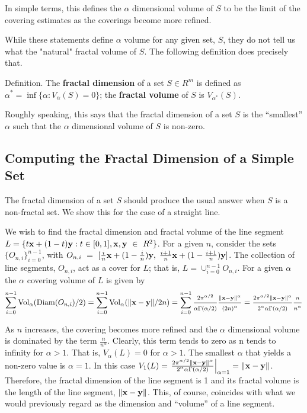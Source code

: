  In simple terms, this defines the $\alpha$ dimensional volume of $S$
to be the limit of the covering estimates as the coverings become more refined.

While these statements define $\alpha$ volume for any given set, $S$,
they do not tell us what the "natural" fractal volume of $S$.
 The following definition does precisely that.

\proclaim Definition. The {\bf fractal dimension} of a 
set $S \in R^m$ is defined as
$\alpha^* = \inf\{\alpha : V_\alpha(S) = 0 \}$; the 
{\bf fractal volume} of $S$ is $V_{\alpha^*}(S)$.

Roughly speaking, this says that the fractal dimension of a set $S$ is the
``smallest'' $\alpha$ such that the $\alpha$ dimensional volume of $S$ is non-zero.

\subsection{Computing the Fractal Dimension of a Simple Set}

The fractal dimension of a set $S$ should produce the usual
answer when $S$ is a non-fractal set. We show this for the case of a
straight line.

We wish to find the fractal dimension and fractal volume of the line
segment $L = \{t{\bf x} + (1-t){\bf y} : t \in [0,1] , {\bf x, y}~\in~R^2\}$.
For a given $n$, consider the sets $\{O_{n,i}\}_{i=0}^{n-1}$, with $O_{n,i}~=~
[\frac{i}{n}{\bf x} + (1-\frac{i}{n}){\bf y}, \; \frac{i+1}{n}{\bf x} + (1 -
\frac{i+1}{n}){\bf y}]$. The collection of line segments, $O_{n,i}$, act
as a cover for $L$; that is, $L =
\cup_{i=0}^{n-1} O_{n,i}$. For a given $\alpha$ the
$\alpha$ covering volume of $L$ is given by
$$
\sum_{i=0}^{n-1} {\rm Vol}_\alpha({\rm Diam}(O_{n,i})/2) = \sum_{i=0}^{n-1}
{\rm Vol}_\alpha(\|{\bf x} - {\bf y}\|/2n) =  \sum_{i=0}^{n-1} \frac{2
\pi^{\alpha / 2}}{\alpha \Gamma(\alpha / 2)} \frac{\|{\bf x} - {\bf
y}\|^\alpha}{(2n)^\alpha} = \frac{2 \pi^{\alpha / 2} \|{\bf x} - {\bf
y}\|^\alpha}{2^\alpha \alpha \Gamma(\alpha / 2)} \frac{n}{n^\alpha}
$$

As $n$ increases, the covering becomes more refined and 
the $\alpha$ dimensional volume is dominated by the term
$\frac{n}{n^\alpha}$. Clearly, this term tends to zero as n tends to
infinity for $\alpha > 1$. That is, $V_\alpha(L) = 0$ for $\alpha >
1$. The smallest $\alpha$ that yields a non-zero value is $\alpha =
1$. In this case 
$
V_1(L) = \left. \frac{2\pi^{\alpha / 2} \|{\bf x} - {\bf
y}\|^\alpha}{2^\alpha \alpha \Gamma(\alpha / 2)} \right|_{\alpha=1} = \| {\bf
x} - {\bf y}\|$. 
Therefore, the fractal dimension of the line segment is
1 and its fractal volume is the length of the line segment, $\|{\bf x} - {\bf
y}\|$. This, of course, coincides with what we would previously regard
as the dimension and ``volume'' of a line segment.

